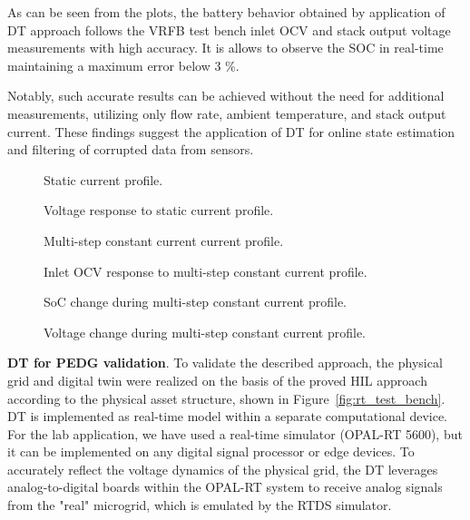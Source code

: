 As can be seen from the plots, the battery behavior obtained by application of DT approach follows the VRFB test bench inlet OCV and stack output voltage measurements with high accuracy. It is allows to observe the SOC in real-time maintaining a maximum error below 3 \%.  

Notably, such accurate results can be achieved without the need for additional measurements, utilizing only flow rate, ambient temperature, and stack output current. These findings suggest the application of DT for online state estimation and filtering of corrupted data from sensors.

\begin{figure}[ht]
    \caption{Static current profile.}\label{fig:statprofile_i}
\end{figure}
\begin{figure}[ht]
    \caption{Voltage response to static current profile.}\label{fig:statprofile_v}
\end{figure}
\begin{figure}[ht]
    \caption{Multi-step constant current current profile.}\label{fig:dynprofile_i}
\end{figure}
\begin{figure}[ht]
    \caption{Inlet OCV response to multi-step constant current profile.}\label{fig:dynprofile_ocv}
\end{figure}
\begin{figure}[ht]
    \caption{SoC change during multi-step constant current profile.}\label{fig:dynprofile_soc2}
\end{figure}
\begin{figure}[ht]
    \caption{Voltage change during multi-step constant current profile.}\label{fig:dynprofile_v}
\end{figure}

\textbf{DT for PEDG validation}. To validate the described approach, the physical grid and digital twin were realized on the basis of the proved HIL approach according to the physical asset structure, shown in Figure~\cref{fig:rt_test_bench}. DT is implemented as real-time model within a separate computational device. For the lab application, we have used a real-time simulator (OPAL-RT 5600), but it can be implemented on any digital signal processor or edge devices. To accurately reflect the voltage dynamics of the physical grid, the DT leverages analog-to-digital boards within the OPAL-RT system to receive analog signals from the "real" microgrid, which is emulated by the RTDS simulator.

